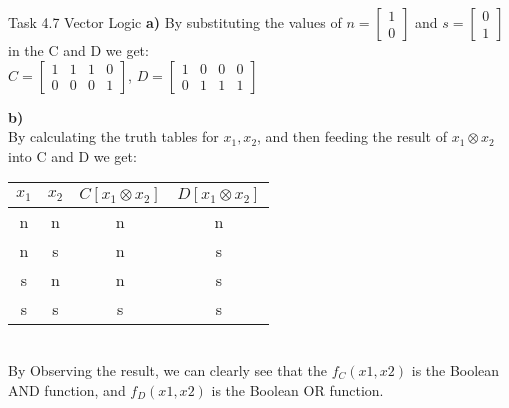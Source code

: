 \documentclass[aspectratio=169]{beamer}
\begin{document}
\begin{frame}[fragile]{Task 4.7 Vector Logic}
\textbf{a)} By substituting the values of $n =  \begin{bmatrix} 1 \\ 0 \end{bmatrix}$   and $s = \begin{bmatrix} 0 \\ 1 \end{bmatrix}$  in the C and D we get:\\
$C = \begin{bmatrix} 1 & 1 & 1& 0\\ 0& 0& 0& 1 \end{bmatrix}$,
$D = \begin{bmatrix} 1 & 0 & 0& 0\\ 0& 1& 1& 1 \end{bmatrix}$


\textbf{b)}\\ By calculating the truth tables for $x_1, x_2$, and then feeding the result of $x_1 \otimes x_2$ into C and D we get:\\

\begin{tabular}{ |c|c|c|c| }
\hline
$x_1$ & $x_2$ & $C[x_1 \otimes x_2]$ & $D[x_1 \otimes x_2]$ \\
\hline

n & n & n & n \\
n & s & n & s \\
s & n & n & s \\
s & s & s & s \\
\hline
\end{tabular}
\newline
\\By Observing the result, we can clearly see that the $f_C(x1, x2)$ is the Boolean AND function, and $f_D(x1, x2)$ is the Boolean OR function.\\
\end{frame}
\end{document}
